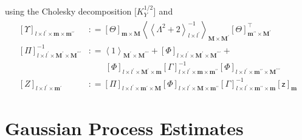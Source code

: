 \documentclass[preprint,12pt]{elsarticle}
\newcommand*{\M}[1]{\ensuremath{#1}\xspace}
\newcommand*{\x}{\times}
\newcommand*{\mi}[1]{\mathbf{#1}}
\newcommand*{\rv}[1]{\mathsf{#1}}
\newcommand*{\te}[2][]{\left\lbrack{#2}\right\rbrack_{#1}}
\newcommand*{\tte}[2][]{\lbrack{#2}\rbrack_{#1}}
\newcommand*{\diag}[2][]{\left\langle{#2}\right\rangle_{#1}}
\newcommand*{\deq}{\M{\mathrel{\mathop:}=}}
\begin{document}
            using the Cholesky decomposition $\tte[]{K_{Y}^{1/2}}$ and
            \begin{equation*}
                \begin{aligned}
                    \te[l\x l^{\prime}\x\mi{m}\x\mi{m^{\prime\prime}}]{\Upsilon} &\deq \te[\mi{m}\x\mi{M}]{\Theta}
                    \diag[\mi{M}\x\mi{M^{\prime}}]{\diag[l\x l^{\prime}]{\Lambda^{2}+2}^{-1}} \te[\mi{m^{\prime\prime}}\x\mi{M^{\prime}}]{\Theta}^{\intercal} \\
                    \te[l\x l^{\prime}\x \mi{M^{\prime}}\x\mi{M^{\prime\prime\prime}}]{\Pi}^{-1} &\deq 
                    \diag[\mi{M^{\prime}}\x\mi{M^{\prime\prime\prime}}]{1} + \te[l\x l^{\prime}\x \mi{M^{\prime}}\x\mi{M^{\prime\prime\prime}}]{\Phi} + \\
                    &\phantom{\deq}\ \te[l\x l^{\prime}\x\mi{M^{\prime}\x\mi{m}}]{\Phi}
                    \te[l\x l^{\prime}\x\mi{m}\x\mi{m^{\prime\prime}}]{\Gamma}^{-1} \te[l\x l^{\prime}\x\mi{m^{\prime\prime}}\x\mi{M^{\prime\prime\prime}}]{\Phi} \\
                    \te[l\x l^{\prime}\x \mi{m^{\prime}}]{Z} &\deq 
                    \te[l\x l^{\prime}\x \mi{m^{\prime}}\x\mi{M}]{\Pi}
                    \te[l\x l^{\prime}\x\mi{M}\x\mi{m^{\prime\prime}}]{\Phi}
                    \te[l\x l^{\prime}\x\mi{m^{\prime\prime}}\x\mi{m}]{\Gamma}^{-1}
                    \te[\mi{m}]{\rv{z}}
                \end{aligned}
            \end{equation*}


\section{Gaussian Process Estimates}\label{sec:GPEst}
\end{document}
